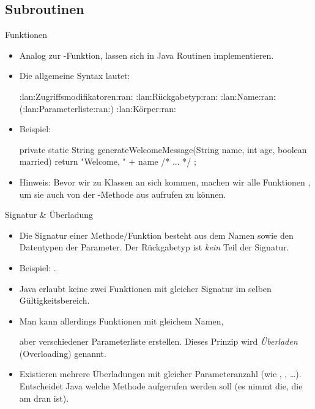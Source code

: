 \subsection{Subroutinen}
\begin{frame}[fragile]{Funktionen}
    \begin{itemize}[<+(1)->]
        \item Analog zur -Funktion, lassen sich in Java Routinen implementieren.
        \item Die allgemeine Syntax lautet:\pause{}
{\footnotesize
\begin{plainjava}
:lan:Zugriffsmodifikatoren:ran: :lan:Rückgabetyp:ran: :lan:Name:ran:(:lan:Parameterliste:ran:) {
    :lan:Körper:ran:
}
\end{plainjava}
}
        \item Beispiel: \pause{}
{\footnotesize
\begin{plainjava}
private static String generateWelcomeMessage(String name, int age,
        boolean married) {
    return "Welcome, " + name /* ... */ ;
}
\end{plainjava}
}
        \item Hinweis:\pause{} Bevor wir zu Klassen an sich kommen,\pause{} machen wir alle Funktionen ,\pause{} um sie auch von der -Methode aus aufrufen zu können.
    \end{itemize}
\end{frame}

\begin{frame}{Signatur \& Überladung}
    \begin{itemize}[<+(1)->]
        \item Die Signatur einer Methode/Funktion besteht aus dem Namen sowie den Datentypen der Parameter.\pause{} Der Rückgabetyp ist \emph{kein} Teil der Signatur.
        \item Beispiel: .
        \item Java erlaubt keine zwei Funktionen mit gleicher Signatur im selben Gültigkeitsbereich.
        \item Man kann allerdings Funktionen mit gleichem Namen,\par{} aber verschiedener Parameterliste erstellen.\pause{} Dieses Prinzip wird \emph{Überladen} (Overloading) genannt.
        \item Existieren mehrere Überladungen mit gleicher Parameteranzahl\pause{} (wie , , \ldots).\pause{} Entscheidet Java welche Methode aufgerufen werden soll\pause{} (es nimmt die,\pause{} die am  dran ist).
    \end{itemize}
\end{frame}


